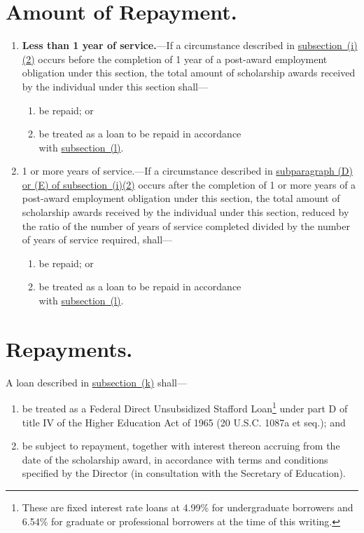 \documentclass{article}
\begin{document}
    \section{Amount of Repayment.}\label{sec:amount}
\begin{enumerate}
            \item {\bf Less than 1 year of service.}---If a circumstance 
        described in \hyperref[enum:terms]{subsection~(i)(2)} occurs before the completion of 
        1 year of a post-award employment obligation under this 
        section, the total amount of scholarship awards received by the 
        individual under this section shall---
\begin{enumerate}
                    \item be repaid; or
                    \item be treated as a loan to be repaid in accordance \\
                with \hyperref[sec:repay]{subsection~(l)}.
\end{enumerate}
            \item 1 or more years of service.---If a circumstance 
        described in \hyperref[enum:postaward]{subparagraph (D) or (E) of subsection~(i)(2)} 
        occurs after the completion of 1 or more years of a post-award 
        employment obligation under this section, the total amount of 
        scholarship awards received by the individual under this 
        section, reduced by the ratio of the number of years of service 
        completed divided by the number of years of service required, 
        shall---
\begin{enumerate}
                    \item be repaid; or
                    \item be treated as a loan to be repaid in accordance \\
                with \hyperref[sec:repay]{subsection~(l)}.
\end{enumerate}
\end{enumerate}
    \section{Repayments.}\label{sec:repay}A loan described in \hyperref[sec:amount]{subsection~(k)} shall---
\begin{enumerate}
            \item be treated as a Federal Direct Unsubsidized Stafford 
        Loan\footnote{These are fixed interest rate loans at 4.99\% for undergraduate borrowers and 6.54\% for graduate or professional borrowers at the time of this writing.} under part D of title IV of the Higher Education Act of 
        1965 (20 U.S.C. 1087a et seq.); and
            \item be subject to repayment, together with interest thereon 
        accruing from the date of the scholarship award, in accordance 
        with terms and conditions specified by the Director (in 
        consultation with the Secretary of Education).
\end{enumerate}
\end{document}
